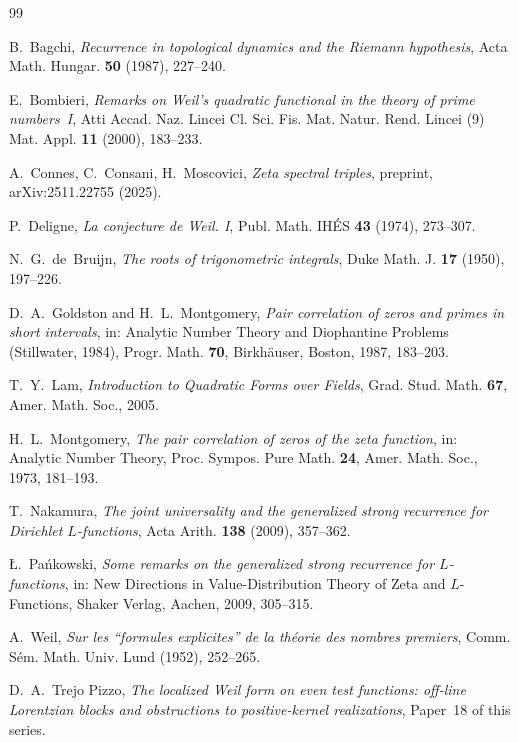 \documentclass[11pt]{amsart}
\theoremstyle{definition}
\theoremstyle{remark}
\begin{document}
\begin{thebibliography}{99}

 B.~Bagchi, \emph{Recurrence in topological dynamics and the Riemann
hypothesis}, Acta Math. Hungar. \textbf{50} (1987), 227--240.

 E.~Bombieri, \emph{Remarks on Weil's quadratic functional in the theory
of prime numbers~I}, Atti Accad. Naz. Lincei Cl. Sci. Fis. Mat. Natur. Rend. Lincei (9) Mat.
Appl. \textbf{11} (2000), 183--233.

 A.~Connes, C.~Consani, H.~Moscovici, \emph{Zeta spectral triples}, preprint,
arXiv:2511.22755 (2025).

 P.~Deligne, \emph{La conjecture de Weil. I},
Publ. Math. IH\'ES \textbf{43} (1974), 273--307.

 N.~G.~de~Bruijn, \emph{The roots of trigonometric
integrals}, Duke Math. J. \textbf{17} (1950), 197--226.

 D.~A.~Goldston and H.~L.~Montgomery, \emph{Pair correlation of zeros and
primes in short intervals}, in: Analytic Number Theory and Diophantine Problems (Stillwater,
1984), Progr. Math. \textbf{70}, Birkh\"auser, Boston, 1987, 183--203.

 T.~Y.~Lam, \emph{Introduction to Quadratic Forms over Fields}, Grad. Stud. Math.
\textbf{67}, Amer. Math. Soc., 2005.

 H.~L.~Montgomery, \emph{The pair correlation of zeros of the zeta function},
in: Analytic Number Theory, Proc. Sympos. Pure Math. \textbf{24}, Amer. Math. Soc., 1973,
181--193.

 T.~Nakamura, \emph{The joint universality and the generalized strong recurrence
for Dirichlet $L$-functions}, Acta Arith. \textbf{138} (2009), 357--362.

 \L.~Pa\'nkowski, \emph{Some remarks on the generalized strong recurrence for
$L$-functions}, in: New Directions in Value-Distribution Theory of Zeta and $L$-Functions,
Shaker Verlag, Aachen, 2009, 305--315.

 A.~Weil, \emph{Sur les ``formules explicites'' de la
th\'eorie des nombres premiers}, Comm. S\'em. Math. Univ. Lund (1952),
252--265.

 D.~A.~Trejo Pizzo, \emph{The localized Weil form on even test functions: off-line
Lorentzian blocks and obstructions to positive-kernel realizations}, Paper~18 of this series.


\end{thebibliography}
\end{document}
